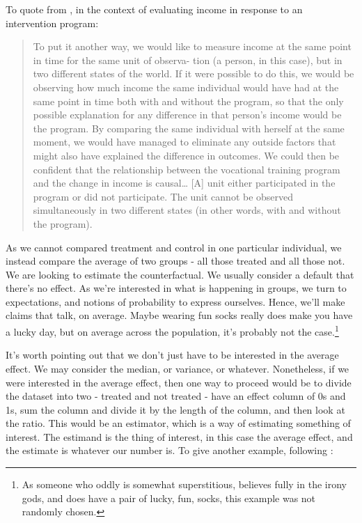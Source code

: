 \documentclass[
]{book}
\begin{document}
To quote from \citet[p.48]{gertler2016impact}, in the context of evaluating income in response to an intervention program:

\begin{quote}
To put it another way, we would like to measure income at the same point in time for the same unit of observa- tion (a person, in this case), but in two different states of the world. If it were possible to do this, we would be observing how much income the same individual would have had at the same point in time both with and without the program, so that the only possible explanation for any difference in that person's income would be the program. By comparing the same individual with herself at the same moment, we would have managed to eliminate any outside factors that might also have explained the difference in outcomes. We could then be confident that the relationship between the vocational training program and the change in income is causal\ldots{} {[}A{]} unit either participated in the program or did not participate. The unit cannot be observed simultaneously in two different states (in other words, with and without the program).
\end{quote}

As we cannot compared treatment and control in one particular individual, we instead compare the average of two groups - all those treated and all those not. We are looking to estimate the counterfactual. We usually consider a default that there's no effect. As we're interested in what is happening in groups, we turn to expectations, and notions of probability to express ourselves. Hence, we'll make claims that talk, on average. Maybe wearing fun socks really does make you have a lucky day, but on average across the population, it's probably not the case.\footnote{As someone who oddly is somewhat superstitious, believes fully in the irony gods, and does have a pair of lucky, fun, socks, this example was not randomly chosen.}

It's worth pointing out that we don't just have to be interested in the average effect. We may consider the median, or variance, or whatever. Nonetheless, if we were interested in the average effect, then one way to proceed would be to divide the dataset into two - treated and not treated - have an effect column of 0s and 1s, sum the column and divide it by the length of the column, and then look at the ratio. This would be an estimator, which is a way of estimating something of interest. The estimand is the thing of interest, in this case the average effect, and the estimate is whatever our number is. To give another example, following \citet{gelmanhillvehtari2020}:
\end{document}
